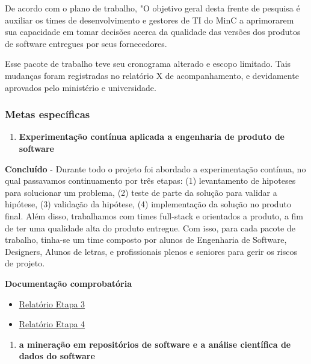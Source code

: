 De acordo com o plano de trabalho, "O objetivo geral desta frente de
pesquisa é auxiliar os times de desenvolvimento e gestores de TI do MinC
a aprimorarem sua capacidade em tomar decisões acerca da qualidade das
versões dos produtos de software entregues por seus fornecedores.

Esse pacote de trabalho teve seu cronograma alterado e escopo limitado.
Tais mudanças foram registradas no relatório X de acompanhamento, e
devidamente aprovados pelo ministério e universidade.

\hypertarget{metas-especuxedficas-5}{%
\subsubsection{Metas específicas}\label{metas-especuxedficas-5}}

\begin{enumerate}
\def\labelenumi{\arabic{enumi}.}
\tightlist
\item
  \textbf{Experimentação contínua aplicada a engenharia de produto de
  software}
\end{enumerate}

\textbf{Concluído} - Durante todo o projeto foi abordado a
experimentação contínua, no qual passavamos continuamento por três
etapas: (1) levantamento de hipoteses para solucionar um problema, (2)
teste de parte da solução para validar a hipótese, (3) validação da
hipótese, (4) implementação da solução no produto final. Além disso,
trabalhamos com times full-stack e orientados a produto, a fim de ter
uma qualidade alta do produto entregue. Com isso, para cada pacote de
trabalho, tinha-se um time composto por alunos de Engenharia de
Software, Designers, Alunos de letras, e profissionais plenos e seniores
para gerir os riscos de projeto.

\textbf{Documentação comprobatória}

\begin{itemize}
\item
  \href{https://github.com/lappis-unb/EcossistemasSWLivre/blob/master/Relatorios/R3/RELATÓRIO\%20ETAPA\%203.md}{Relatório
  Etapa 3}
\item
  \href{https://github.com/lappis-unb/EcossistemasSWLivre/blob/master/Relatorios/R4/RELATÓRIO\%20ETAPA\%204.pdf}{Relatório
  Etapa 4}
\end{itemize}

\begin{enumerate}
\def\labelenumi{\arabic{enumi}.}
\setcounter{enumi}{1}
\tightlist
\item
  \textbf{a mineração em repositórios de software e a análise científica
  de dados do software}
\end{enumerate}

